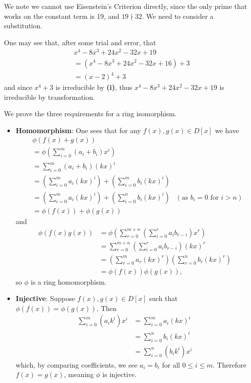 \begin{questions}
\begin{partquestions}{\roman*}
        \item We note we cannot use Eisenstein's Criterion directly, since the only prime that works on the constant term is 19, and $19 \nmid 32$. We need to consider a substitution.

        One may see that, after some trial and error, that
        \begin{align*}
            &x^4 - 8x^3 + 24x^2 - 32x + 19\\
            &= (x^4 - 8x^3 + 24x^2 - 32x + 16) + 3\\
            &= (x - 2)^4 + 3
        \end{align*}
        and since $x^4 + 3$ is irreducible by \textbf{(i)}, thus $x^4 - 8x^3 + 24x^2 - 32x + 19$ is irreducible by transformation.
    \end{partquestions}

    \item We prove the three requirements for a ring isomorphism.
    \begin{itemize}
        \item \textbf{Homomorphism}: One sees that for any $f(x), g(x) \in D[x]$ we have
        \begin{align*}
            &\phi(f(x) + g(x))\\
            &= \phi\left(\sum_{i=0}^m(a_i+b_i)x^i\right)\\
            &= \sum_{i=0}^m(a_i+b_i)(kx)^i\\
            &= \left(\sum_{i=0}^ma_i(kx)^i\right) + \left(\sum_{i=0}^mb_i(kx)^i\right)\\
            &= \left(\sum_{i=0}^ma_i(kx)^i\right) + \left(\sum_{i=0}^nb_i(kx)^i\right) & (\text{as } b_i = 0 \text{ for } i > n)\\
            &= \phi(f(x)) + \phi(g(x))
        \end{align*}
        and
        \begin{align*}
            \phi(f(x)g(x)) &= \phi\left(\sum_{r=0}^{m+n}\left(\sum_{i=0}^ra_ib_{r-i}\right)x^r\right)\\
            &= \sum_{r=0}^{m+n}\left(\sum_{i=0}^ra_ib_{r-i}\right)(kx)^r\\
            &= \left(\sum_{r=0}^ma_r(kx)^r\right)\left(\sum_{r=0}^nb_r(kx)^r\right)\\
            &= \phi(f(x))\phi(g(x)),
        \end{align*}
        so $\phi$ is a ring homomorphism.

        \item \textbf{Injective}: Suppose $f(x), g(x) \in D[x]$ such that $\phi(f(x)) = \phi(g(x))$. Then
        \begin{align*}
            \sum_{i=0}^m(a_ik^i)x^i &= \sum_{i=0}^ma_i(kx)^i\\
            &= \sum_{i=0}^nb_i(kx)^i\\
            &= \sum_{i=0}^n(b_ik^i)x^i
        \end{align*}
        which, by comparing coefficients, we see $a_i = b_i$ for all $0 \leq i \leq m$. Therefore $f(x) = g(x)$, meaning $\phi$ is injective.


\end{itemize}
\end{questions}
